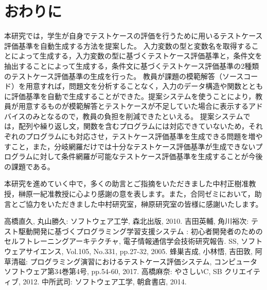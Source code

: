 \documentclass{tpu-sotu}
\begin{document}
\chapter{おわりに}
本研究では，学生が自身でテストケースの評価を行うために用いるテストケース評価基準を自動生成する方法を提案した。
入力変数の型と変数名を取得することによって生成する，入力変数の型に基づくテストケース評価基準と，条件文を抽出することによって生成する，条件文に基づくテストケース評価基準の2種類のテストケース評価基準の生成を行った。
教員が課題の模範解答（ソースコード）を用意すれば，問題文を分析することなく，入力のデータ構造や関数とともに評価基準を自動で生成することができた。提案システムを使うことにより，教員が用意するものが模範解答とテストケースが不足していた場合に表示するアドバイスのみとなるので，教員の負担を削減できたといえる。
提案システムでは，配列や繰り返し文，関数を含むプログラムには対応できていないため，それぞれのプログラムにも対応させ，テストケース評価基準を生成できる問題を増やすこと，また，分岐網羅だけでは十分なテストケース評価基準が生成できないプログラムに対して条件網羅が可能なテストケース評価基準を生成することが今後の課題である。


\acknowledgements
本研究を進めていく中で，多くの助言とご指摘をいただきました中村正樹准教授，榊原一紀准教授に心より感謝の意を表します。また，合同ゼミにおいて，助言とご協力をいただきました中村研究室，榊原研究室の皆様に感謝いたします。
\begin{thebibliography}{3}
    高橋直久, 丸山勝久: ソフトウェア工学, 森北出版, 2010.
    吉田英輔, 角川裕次: テスト駆動開発に基づくプログラミング学習支援システム : 初心者開発者のためのセルフトレーニングアーキテクチャ, 電子情報通信学会技術研究報告. SS, ソフトウェアサイエンス, Vol.105, No.331, pp.27-32, 2005.
    蜂巣吉成, 小林悟, 吉田敦, 阿草清磁: プログラミング演習におけるテストケース評価システム, コンピュータソフトウェア第34巻第4号, pp.54-60, 2017.
    高橋麻奈: やさしいC, SB クリエイティブ, 2012.
    中所武司: ソフトウェア工学, 朝倉書店, 2014.
\end{thebibliography}
\end{document}
